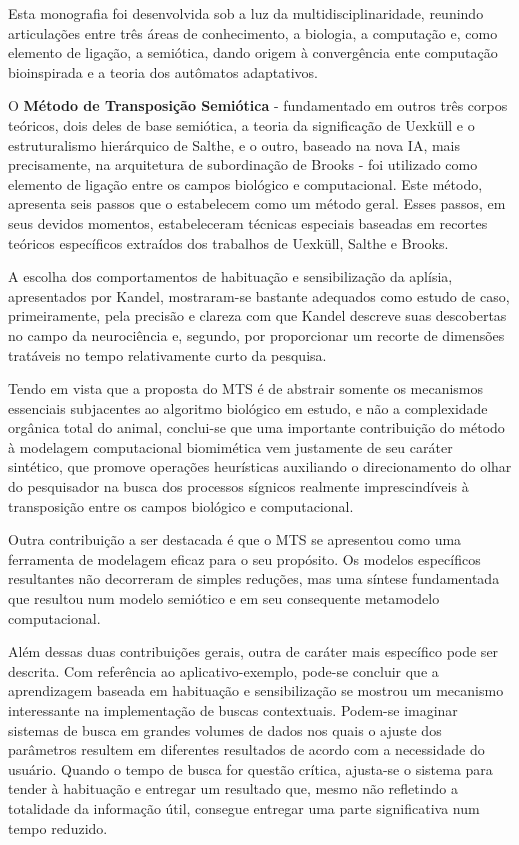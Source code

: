 Esta monografia foi desenvolvida sob a luz da multidisciplinaridade, reunindo articulações entre três áreas de conhecimento, a biologia, a computação e, como elemento de ligação, a semiótica, dando origem à convergência ente computação bioinspirada e a teoria dos autômatos adaptativos.

O \textbf{Método de Transposição Semiótica} - fundamentado em outros três corpos teóricos, dois deles de base semiótica, a teoria da significação de Uexküll e o estruturalismo hierárquico de Salthe, e o outro, baseado na nova IA, mais precisamente, na arquitetura de subordinação de Brooks - foi utilizado como elemento de ligação entre os campos biológico e computacional. Este método, apresenta seis passos que o estabelecem como um método geral. Esses passos, em seus devidos momentos, estabeleceram técnicas especiais baseadas em recortes teóricos específicos extraídos dos trabalhos de Uexküll, Salthe e Brooks.

A escolha dos comportamentos de habituação e sensibilização da aplísia, apresentados por Kandel, mostraram-se bastante adequados como estudo de caso, primeiramente, pela precisão e clareza com que Kandel descreve suas descobertas no campo da neurociência e, segundo, por proporcionar um recorte de dimensões tratáveis no tempo relativamente curto da pesquisa.

Tendo em vista que a proposta do MTS é de abstrair somente os mecanismos essenciais subjacentes ao algoritmo biológico em estudo, e não a complexidade orgânica total do animal, conclui-se que uma importante contribuição do método à modelagem computacional biomimética vem justamente de seu caráter sintético, que promove operações heurísticas auxiliando o direcionamento do olhar do pesquisador na busca dos processos sígnicos realmente imprescindíveis à transposição entre os campos biológico e computacional.

Outra contribuição a ser destacada é que o MTS se apresentou como uma ferramenta de modelagem eficaz para o seu propósito. Os modelos específicos resultantes não decorreram de simples reduções, mas uma síntese fundamentada que resultou num modelo semiótico e em seu consequente metamodelo computacional.

Além dessas duas contribuições gerais, outra de caráter mais específico pode ser descrita. Com referência ao aplicativo-exemplo, pode-se concluir que a aprendizagem baseada em habituação e sensibilização se mostrou um mecanismo interessante na implementação de buscas contextuais. Podem-se imaginar sistemas de busca em grandes volumes de dados nos quais o ajuste dos parâmetros resultem em diferentes resultados de acordo com a necessidade do usuário. Quando o tempo de busca for questão crítica, ajusta-se o sistema para tender à habituação e entregar um resultado que, mesmo não refletindo a totalidade da informação útil, consegue entregar uma parte significativa num tempo reduzido.

